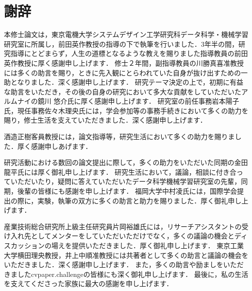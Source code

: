 \chapter*{謝辞}
本修士論文は，東京電機大学システムデザイン工学研究科データ科学・機械学習研究室に所属し，前田英作教授の指導の下で執筆を行いました．3年半の間，研究指導にとどまらず，人生の道標となるような教えを賜りました指導教員の前田英作教授に厚く感謝申し上げます．
修士２年間，副指導教員の川勝真喜准教授には多くの助言を賜り，ときに先入観にとらわれていた自身が抜け出すための一助となりました．深く感謝申し上げます．
研究テーマ決定の上で，初期に有益な助言をいただき，その後の自身の研究において多大な貢献をしていただいたアルムナイの鏡川 悠介氏に厚く感謝申し上げます．
研究室の前任事務岩本陽子氏，現任事務佐々木理央氏には，学会参加等の事務手続きにおいて多くの助力を賜り，修士生活を支えていただきました．深く感謝申し上げます．

酒造正樹客員教授には，論文指導等，研究生活において多くの助力を賜りました．厚く感謝申しあげます．

研究活動における数回の論文提出に際して，多くの助力をいただいた同期の金田龍平氏には厚く御礼申し上げます．
研究生活において，議論，相談に付き合っていただいたり，疑問に答えていただいたデータ科学機械学習研究室の先輩，同期，後輩の皆様にも感謝を申し上げます．
福岡大学中村凌氏には，国際学会提出の際に，実験，執筆の双方に多くの助言と助力を賜りました．厚く御礼申し上げます．

産業技術総合研究所上級主任研究員片岡裕雄氏には，リサーチアシスタントの受け入れ先としてメンターをしていただいただけでなく，多くの議論の機会とディスカッションの場えを提供いただきました．厚く御礼申し上げます．
東京工業大学横田理央教授，井上中順准教授には共著者として多くの助言と議論の機会をいただきました．深く感謝申し上げます．
また，多くの助言や励ましをいただきましたcvpaper.challengeの皆様にも深く御礼申し上げます．
最後に，私の生活を支えてくださった家族に最大の感謝を申し上げます．
\newpage